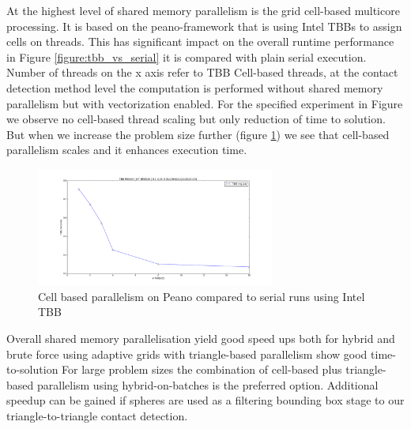 \documentclass[times,12pt]{article}
\begin{document}



At the highest level of shared memory parallelism is the grid cell-based multicore processing. It is based on the peano-framework that is using Intel TBBs to assign cells on threads. This has significant impact on the overall runtime performance in Figure \ref{figure:tbb_vs_serial} it is compared with plain serial execution. Number of threads on the x axis refer to TBB Cell-based threads, at the contact detection method level the computation is performed without shared memory parallelism but with vectorization enabled. For the specified experiment in Figure {} we observe no cell-based thread scaling but only reduction of time to solution. But when we increase the problem size further (figure \ref{figure:tbb_scaling}) we see that cell-based parallelism scales and it enhances execution time. 

\begin{figure}[htb]
  \begin{center}
    \includegraphics[width=0.7\textwidth]{experiments/random/omp/tbb_regular_x2.png}
  \end{center}
  \caption{Cell based parallelism on Peano compared to serial runs using Intel TBB}
  \label{figure:tbb_scaling}
\end{figure}

Overall shared memory parallelisation yield good speed ups both for hybrid and brute force using adaptive grids with triangle-based parallelism show good time-to-solution For large problem sizes the combination of cell-based plus triangle-based parallelism using hybrid-on-batches is the preferred option. Additional speedup can be gained if spheres are used as a filtering bounding box stage to our triangle-to-triangle contact detection.
\end{document}
